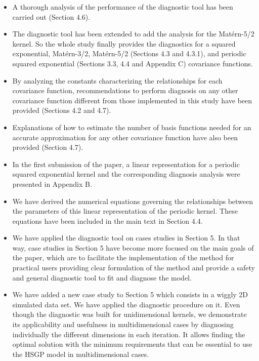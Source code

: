 \documentclass[11pt]{report}
\begin{document}
\begin{itemize}
\item A thorough analysis of the performance of the diagnostic tool has been carried out (Section 4.6).

\item The diagnostic tool has been extended to add the analysis for the Mat\'ern-5/2 kernel. So the whole study finally provides the diagnostics for a squared exponential, Mat\'ern-3/2, Mat\'ern-5/2 (Sections 4.3 and 4.3.1), and periodic squared exponential (Sections 3.3, 4.4 and Appendix C) covariance functions. 

\item By analyzing the constants characterizing the relationships for each covariance function, recommendations to perform diagnosis on any other covariance function different from those implemented in this study have been provided (Sections 4.2 and 4.7).

\item Explanations of how to estimate the number of basis functions needed for an accurate approximation for any other covariance function have also been provided (Section 4.7).

\item In the first submission of the paper, a linear representation for a periodic squared exponential kernel and the corresponding diagnosis analysis were presented in Appendix B. 

\item We have derived the numerical equations governing the relationships between the parameters of this linear representation of the periodic kernel. These equations have been included in the main text in Section 4.4.

\item We have applied the diagnostic tool on cases studies in Section 5. In that way, case studies in Section 5 have become more focused on the main goals of the paper, which are to facilitate the implementation of the method for practical users providing clear formulation of the method and provide a safety and general diagnostic tool to fit and diagnose the model.

\item We have added a new case study to Section 5 which consists in a wiggly 2D simulated data set. We have applied the diagnostic procedure on it. Even though the diagnostic was built for unidimensional kernels, we demonstrate its applicability and usefulness in multidimensional cases by diagnosing individually the different dimensions in each iteration. It allows finding the  optimal solution with the minimum requirements that can be essential to use the HSGP model in multidimensional cases.


\end{itemize}
\end{document}
